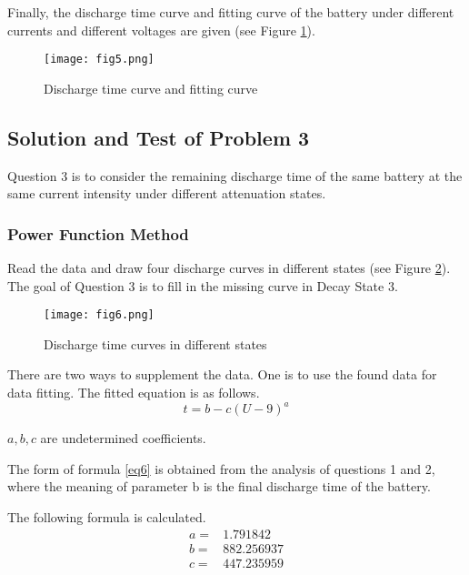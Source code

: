 \documentclass[conference]{IEEEtran}
\begin{document}
Finally, the discharge time curve and fitting curve of the battery under different currents and different voltages are given (see Figure \ref{fig5}).
\begin{figure}[htbp]
	\centerline{\texttt{[image: fig5.png]}}
	\caption{Discharge time curve and fitting curve}
	\label{fig5}
\end{figure}

\subsection{Solution and Test of Problem 3}

Question 3 is to consider the remaining discharge time of the same battery at the same current intensity under different attenuation states.

\subsubsection{ Power Function Method} Read the data and draw four discharge curves in different states (see Figure \ref{fig6}). The goal of Question 3 is to fill in the missing curve in Decay State 3.

\begin{figure}[htbp]
	\centerline{\texttt{[image: fig6.png]}}
	\caption{Discharge time curves in different states}
	\label{fig6}
\end{figure}

  There are two ways to supplement the data. One is to use the found data for data fitting. The fitted equation is as follows.
  \begin{equation}
  t = b - c{\left( {U - 9} \right)^a}
  \label{eq6}
  \end{equation}
  
  \emph{$a, b, c$} are undetermined coefficients.
  
  The form of formula \eqref{eq6} is obtained from the analysis of questions 1 and 2, where the meaning of parameter b is the final discharge time of the battery. 
  
  The following formula is calculated.
  \begin{equation}
 \begin{aligned}{}
  a =& 1.791842\\
  b =& 882.256937\\
  c =& 447.235959
  \end{aligned} \label{eq7}
   \end{equation}
   
\end{document}
